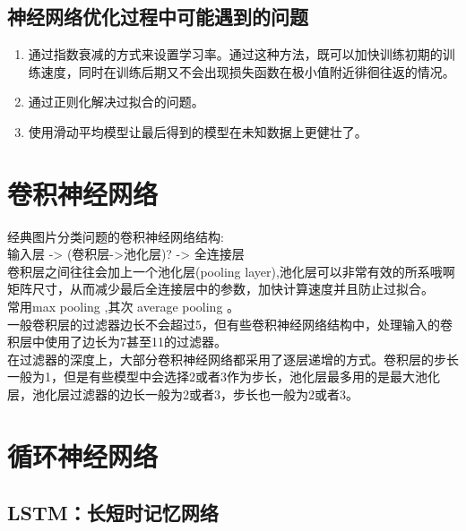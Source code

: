 \documentclass[16pt,UTF8]{ctexart}
\begin{document}
\subsection{神经网络优化过程中可能遇到的问题}
	\begin{enumerate}
	\item 通过指数衰减的方式来设置学习率。通过这种方法，既可以加快训练初期的训练速度，同时在训练后期又不会出现损失函数在极小值附近徘徊往返的情况。
	\item 通过正则化解决过拟合的问题。
	\item 使用滑动平均模型让最后得到的模型在未知数据上更健壮了。
	\end{enumerate}

\section{卷积神经网络}
	\indent 经典图片分类问题的卷积神经网络结构:\\输入层 -> (卷积层->池化层)? -> 全连接层\\
	\indent 卷积层之间往往会加上一个池化层(pooling layer),池化层可以非常有效的所系哦啊矩阵尺寸，从而减少最后全连接层中的参数，加快计算速度并且防止过拟合。\\
	\indent 常用max pooling ,其次 average pooling 。\\
	\indent 一般卷积层的过滤器边长不会超过5，但有些卷积神经网络结构中，处理输入的卷积层中使用了边长为7甚至11的过滤器。\\
	\indent 在过滤器的深度上，大部分卷积神经网络都采用了逐层递增的方式。卷积层的步长一般为1，但是有些模型中会选择2或者3作为步长，池化层最多用的是最大池化层，池化层过滤器的边长一般为2或者3，步长也一般为2或者3。

	
\section{循环神经网络}
	\subsection{LSTM：长短时记忆网络}
	
	
	
	
	
	
	
	
	
\end{document}
